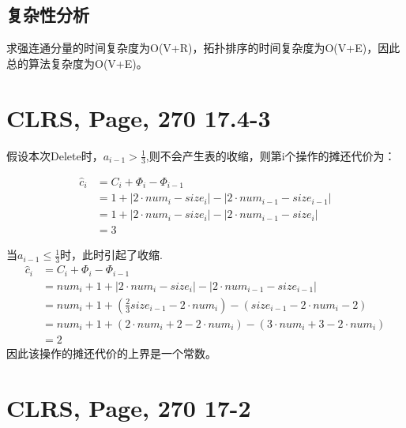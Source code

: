 \documentclass[UTF8]{ctexart}
\begin{document}
 \subsection{复杂性分析}
 求强连通分量的时间复杂度为O(V+R)，拓扑排序的时间复杂度为O(V+E)，因此总的算法复杂度为O(V+E)。


\section{CLRS, Page, 270 17.4-3}
假设本次Delete时，$a_{i-1} > \frac{1}{3}$,则不会产生表的收缩，则第i个操作的摊还代价为：

\begin{align*}
    {\widehat{c}}_i &=  C_i + {\Phi}_i - {\Phi}_{i-1} \\
                    &= 1 + | 2\cdot num_i - size_i | - | 2\cdot num_{i-1} - size_{i-1} |\\
                    &= 1 + | 2\cdot num_i - size_i | - | 2\cdot num_{i-1} - size_{i} |\\
                    &= 3           
\end{align*}

当$a_{i-1} \leq \frac{1}{3}$时，此时引起了收缩.
\begin{align*}
    {\widehat{c}}_i &=  C_i + {\Phi}_i - {\Phi}_{i-1} \\
                    &= num_i + 1 + | 2\cdot num_i - size_i | - | 2\cdot num_{i-1} - size_{i-1} |\\
                    &= num_i + 1 + (\frac{2}{3}size_{i-1} - 2\cdot num_i) - (size_{i-1} - 2\cdot num_i - 2)\\
                    &= num_i + 1 + (2\cdot num_i + 2 - 2\cdot num_i) - (3\cdot num_i + 3 - 2\cdot num_i)\\
                    &= 2         
\end{align*}
因此该操作的摊还代价的上界是一个常数。  


\section{CLRS, Page, 270 17-2}
\end{document}
